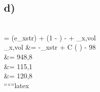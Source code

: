 

\subsection*{d)}
 \\
 \quad \Theta =  (\Delta e_{xstr}) + (1 - )  -  + _{x,vol} \\
_{x,vol} &= -_{xstr} + C \left(  \right) - 98 \\
&= 948,8  \\
&= 115,1  \quad {} \\
&= 120,8 \\
``````latex